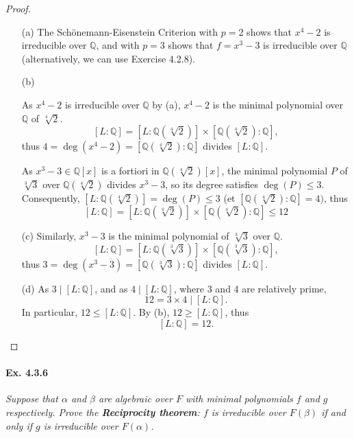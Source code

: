 \documentclass[11pt,a4paper]{article}
\newcommand{\Q}{\mathbb{Q}}
\begin{document}
\begin{proof}
\begin{enumerate}
\item[(a)]
The Sch\"onemann-Eisenstein Criterion with $p=2$ shows that $x^4-2$ is irreducible over $\Q$, and with $p=3$ shows that $f = x^3-3$ is irreducible over $\Q$ (alternatively, we can use Exercise 4.2.8).

\item[(b)]

As $x^4-2$ is irreducible over $\Q$ by (a), $x^4 - 2$ is the minimal polynomial over $\Q$ of $\sqrt[4]{2}$.
$$ [L : \Q] = [L : \Q(\sqrt[4]{2})] \times [\Q(\sqrt[4]{2}):\Q], $$ 
thus $4 = \deg(x^4-2) =  [\Q(\sqrt[4]{2}):\Q]$ divides $ [L : \Q] $.

As $x^3 - 3 \in \mathbb{Q}[x]$ is a fortiori in $\mathbb{Q}(\sqrt[4]{2})[x]$, the minimal polynomial $P$ of $\sqrt[3]{3}$ over $\Q(\sqrt[4]{2})$ divides $x^3-3$, so its degree satisfies $\deg(P) \leq 3$. Consequently, $[L : \Q(\sqrt[4]{2})] = \deg(P) \leq 3$ (et $[\Q(\sqrt[4]{2}):\Q] = 4)$, thus
$$ [L : \Q] = [L : \Q(\sqrt[4]{2})] \times [\Q(\sqrt[4]{2}):\Q] \leq 12$$


\item[(c)]
Similarly, $x^3-3$ is the minimal polynomial of $\sqrt[3]{3}$ over $\Q$.
$$ [L : \Q] = [L : \Q(\sqrt[3]{3})] \times [\Q(\sqrt[3]{3}):\Q], $$
thus $3 = \deg(x^3-3) =  [\Q(\sqrt[3]{3}):\Q]$ divides $ [L : \Q] $.


\item[(d)]
As $3\mid [L : \Q]$,  and as $4 \mid [L : \Q] $, where 3 and 4 are relatively prime, $$12 = 3 \times 4 \mid [L : \Q] .$$ In particular, $12 \leq [L : \Q] $. By (b), $12 \geq [L : \Q] $, thus
$$ [L : \Q] =12.$$

\end{enumerate}
\end{proof}

\paragraph{Ex. 4.3.6}

{\it Suppose that $\alpha$ and $\beta$ are algebraic over $F$ with minimal polynomials $f$ and $g$ respectively. Prove the {\bf Reciprocity theorem}: $f$ is irreducible over $F(\beta)$ if and only if $g$ is irreducible over $F(\alpha)$.
}
\end{document}
